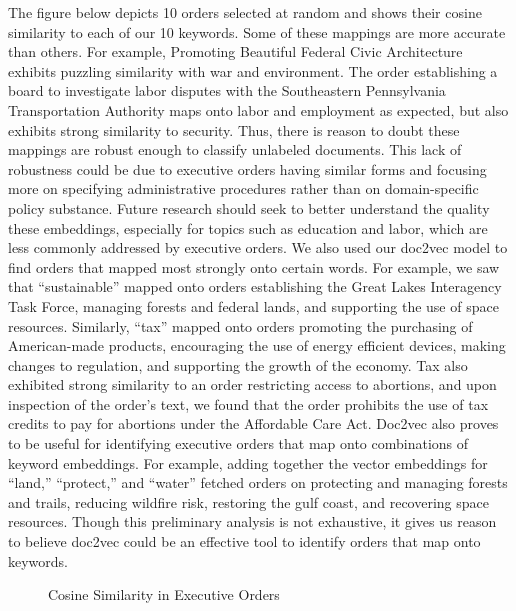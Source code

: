\documentclass{article}
\begin{document}
{{The figure below depicts 10 orders selected at random and shows their cosine similarity to each of our 10 keywords. Some of these mappings are more accurate than others. For example, Promoting Beautiful Federal Civic Architecture exhibits puzzling similarity with war and environment. The order establishing a board to investigate labor disputes with the Southeastern Pennsylvania Transportation Authority maps onto labor and employment as expected, but also exhibits strong similarity to security. Thus, there is reason to doubt these mappings are robust enough to classify unlabeled documents. This lack of robustness could be due to executive orders having similar forms and focusing more on specifying administrative procedures rather than on domain-specific policy substance. Future research should seek to better understand the quality these embeddings, especially for topics such as education and labor, which are less commonly addressed by executive orders.
We also used our doc2vec model to find orders that mapped most strongly onto certain words. For example, we saw that “sustainable” mapped onto orders establishing the Great Lakes Interagency Task Force, managing forests and federal lands, and supporting the use of space resources. Similarly, “tax” mapped onto orders promoting the purchasing of American-made products, encouraging the use of energy efficient devices, making changes to regulation, and supporting the growth of the economy.  Tax also exhibited strong similarity to an order restricting access to abortions, and upon inspection of the order’s text, we found that the order prohibits the use of tax credits to pay for abortions under the Affordable Care Act. 
Doc2vec also proves to be useful for identifying executive orders that map onto combinations of keyword embeddings. For example, adding together the vector embeddings for “land,” “protect,” and “water” fetched orders on protecting and managing forests and trails, reducing wildfire risk, restoring the gulf coast, and recovering space resources. Though this preliminary analysis is not exhaustive, it gives us reason to believe doc2vec could be an effective tool to identify orders that map onto keywords.}
\begin{figure}[H]
	\caption{\label{fig:my-label9} Cosine Similarity in Executive Orders}
\end{figure}
}
\end{document}
